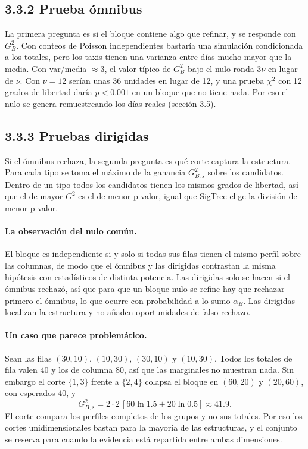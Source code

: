 \documentclass[11pt,a4paper]{article}
\begin{document}
\subsection{3.3.2 Prueba ómnibus}

La primera pregunta es si el bloque contiene algo que refinar, y se responde con
$G^2_B$. Con conteos de Poisson independientes bastaría una simulación condicionada
a los totales, pero los taxis tienen una varianza entre días mucho mayor que la
media. Con var/media $\approx3$, el valor típico de $G^2_B$ bajo el nulo ronda
$3\nu$ en lugar de $\nu$. Con $\nu=12$ serían unas 36 unidades en lugar de 12, y una
prueba $\chi^2$ con 12 grados de libertad daría $p<0.001$ en un bloque que no tiene
nada. Por eso el nulo se genera remuestreando los días reales (sección 3.5).

\subsection{3.3.3 Pruebas dirigidas}

Si el ómnibus rechaza, la segunda pregunta es qué corte captura la estructura. Para
cada tipo se toma el máximo de la ganancia $G^2_{B,s}$ sobre los candidatos. Dentro
de un tipo todos los candidatos tienen los mismos grados de libertad, así que el de
mayor $G^2$ es el de menor p-valor, igual que SigTree elige la división de menor
p-valor.

\paragraph{La observación del nulo común.} El bloque es independiente si y solo si
todas sus filas tienen el mismo perfil sobre las columnas, de modo que el ómnibus y
las dirigidas contrastan la misma hipótesis con estadísticos de distinta potencia.
Las dirigidas solo se hacen si el ómnibus rechazó, así que para que un bloque nulo
se refine hay que rechazar primero el ómnibus, lo que ocurre con probabilidad a lo
sumo $\alpha_B$. Las dirigidas localizan la estructura y no añaden oportunidades de
falso rechazo.

\paragraph{Un caso que parece problemático.} Sean las filas $(30,10)$, $(10,30)$,
$(30,10)$ y $(10,30)$. Todos los totales de fila valen 40 y los de columna 80, así
que las marginales no muestran nada. Sin embargo el corte $\{1,3\}$ frente a
$\{2,4\}$ colapsa el bloque en $(60,20)$ y $(20,60)$, con esperados 40, y
\[
G^2_{B,s}=2\cdot2\,[60\ln1.5+20\ln0.5]\approx41.9 .
\]
El corte compara los perfiles completos de los grupos y no sus totales. Por eso los
cortes unidimensionales bastan para la mayoría de las estructuras, y el conjunto se
reserva para cuando la evidencia está repartida entre ambas dimensiones.
\end{document}
